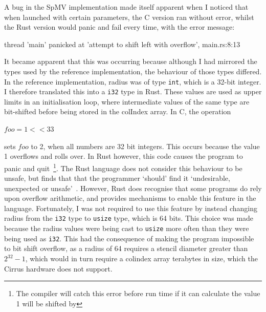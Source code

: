 A bug in the SpMV implementation made itself apparent when I noticed that when launched with certain parameters, the C version ran without error, whilst the Rust version would panic and fail every time, with the error message:

thread 'main' panicked at 'attempt to shift left with overflow', main.rs:8:13

It became apparent that this was occurring because although I had mirrored the types used by the reference implementation, the behaviour of those types differed. In the reference implementation, radius was of type \texttt{int}, which is a 32-bit integer. I therefore translated this into a \texttt{i32} type in Rust. These values are used as upper limits in an initialisation loop, where intermediate values of the same type are bit-shifted before being stored in the colIndex array. In C, the operation

  $foo = 1 << 33$

sets $foo$ to 2, when all numbers are 32 bit integers. This occurs because the value 1 overflows and rolls over. In Rust however, this code causes the program to panic and quit~\footnote{The compiler will catch this error before run time if it can calculate the value 1 will be shifted by}. The Rust language does not consider this behaviour to be unsafe, but finds that that the programmer `should' find it `undesirable, unexpected or unsafe'~\cite{rustunsafe}. However, Rust does recognise that some programs do rely upon overflow arithmetic, and provides mechanisms to enable this feature in the language. Fortunately, I was not required to use this feature by instead changing radius from the \texttt{i32} type to \texttt{usize} type, which is 64 bits. This choice was made because the radius values were being cast to \texttt{usize} more often than they were being used as \texttt{i32}. This had the consequence of making the program impossible to bit shift overflow, as a radius of 64 requires a stencil diameter greater than $2^{32}-1$, which would in turn require a colindex array terabytes in size, which the Cirrus hardware does not support.

